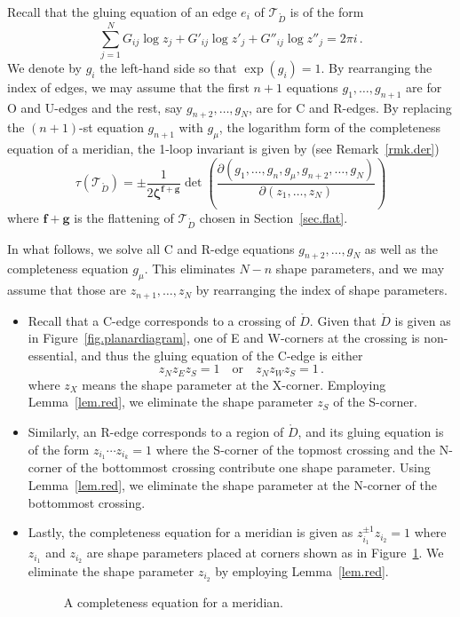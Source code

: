 \documentclass[12pt,reqno]{amsart}
\theoremstyle{definition}
\def\calT{\mathcal T}
\renewcommand{\Ddot}{\mathring{D}}
\begin{document}
Recall that the gluing equation of an edge $e_i$ of $\calT_{\Ddot}$ is of the form
\begin{equation*}
\sum_{j=1}^N  G_{ij} \log z_j + G'_{ij} \log z'_j
+ G''_{ij} \log z''_j  =2 \pi i \, .
\end{equation*}
We denote by $g_i$ the left-hand side so that $\exp(g_i)=1$.
By rearranging the index of edges, we may assume that  the first $n+1$ equations
$g_1,\ldots, g_{n+1}$ are for O and U-edges and the rest, say $g_{n+2},\ldots, g_N$,
are for C and R-edges. By replacing the $(n+1)$-st equation $g_{n+1}$ with $g_\mu$, the
logarithm form of the completeness equation of a meridian, the 1-loop invariant is
given by (see Remark~\ref{rmk.der})
\begin{equation}
\label{eqn.t1}
\tau(\calT_{\Ddot}) = \pm \frac{1}{2{\boldsymbol \zeta}^{\boldsymbol f + \boldsymbol g}}
\det \left(\dfrac{\partial (g_1,\ldots, g_{n}, g_\mu,g_{n+2},\ldots,g_N)}
{\partial (z_1,\ldots,z_N)} \right) 
\end{equation}
where $\boldsymbol f + \boldsymbol g$ is the flattening of $\calT_{\Ddot}$ chosen in
Section~\ref{sec.flat}.

In what follows,  we solve all C and R-edge equations $g_{n+2},\ldots,g_{N}$ as well
as the completeness equation $g_\mu$. This eliminates $N-n$ shape parameters, and
we may assume that those are  $z_{n+1},\ldots, z_{N}$ by rearranging the index of
shape parameters.
\begin{itemize}
\item
  Recall that a C-edge corresponds to a crossing of $\Ddot$. Given that $\Ddot$ is
  given as in Figure~\ref{fig.planardiagram}, one of E and W-corners at the crossing
  is non-essential, and thus the gluing equation of the C-edge is either
  \begin{equation*}
  z_{N} z_{E} z_{S}  = 1 \quad \textrm{or} \quad z_{N} z_{W} z_{S} =1 \, .
\end{equation*}
where $z_X$ means the shape parameter at the X-corner. Employing Lemma~\ref{lem.red},
we eliminate the shape parameter $z_S$ of the S-corner.
\item
  Similarly, an R-edge  corresponds to a region of $\Ddot$, and its gluing equation is
  of the form $ z_{i_1} \cdots  z_{i_k}  = 1$ where the S-corner of the topmost
  crossing and the N-corner of the bottommost crossing contribute one shape parameter.
  Using Lemma~\ref{lem.red}, we eliminate the shape parameter at the N-corner of the
  bottommost crossing. 
\item
  Lastly, the completeness equation for a meridian is given as
  $z_{i_1}^{\pm1} z_{i_2}=1$ where $z_{i_1}$ and $z_{i_2}$ are shape parameters placed
  at corners shown as in Figure~\ref{fig.meridian}. We eliminate the shape parameter
  $z_{i_2}$ by employing Lemma~\ref{lem.red}.
\begin{figure}[htpb!]

\caption{A completeness equation for a meridian.}
\label{fig.meridian}
\end{figure}
\end{itemize}
\end{document}
